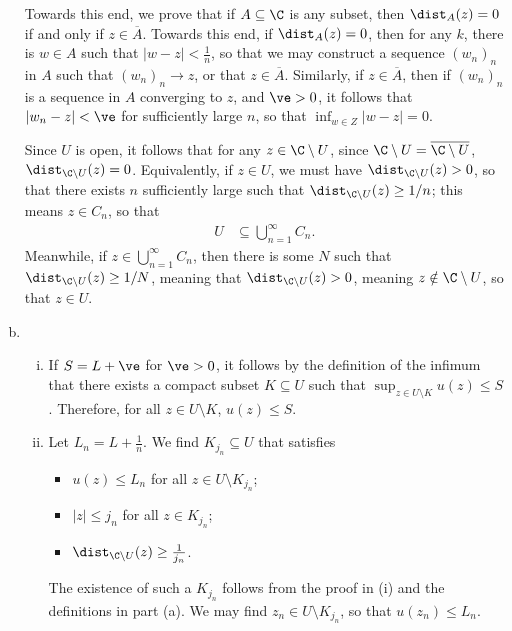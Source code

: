 \documentclass[10pt]{mypackage}
\begin{document}
\begin{solution}
\begin{enumerate}[(a)]
      Towards this end, we prove that if $A\subseteq \C$ is any subset, then $ \dist_{A}(z) = 0 $ if and only if $z\in \overline{A}$. Towards this end, if $\dist_{A}(z) = 0$, then for any $k$, there is $w\in A$ such that $\left\vert w-z \right\vert < \frac{1}{n}$, so that we may construct a sequence $\left( w_n \right)_n$ in $A$ such that $\left( w_n \right)_n\rightarrow z$, or that $z\in \overline{A}$. Similarly, if $z\in \overline{A}$, then if $\left( w_n \right)_n$ is a sequence in $A$ converging to $z$, and $\ve > 0$, it follows that $\left\vert w_n - z \right\vert < \ve$ for sufficiently large $n$, so that $\inf_{w\in Z}\left\vert w-z \right\vert = 0$.\newline

      Since $U$ is open, it follows that for any $z\in \C\setminus U$, since $\C\setminus U = \overline{\C\setminus U}$, $\dist_{\C\setminus U} (z) = 0$. Equivalently, if $z\in U$, we must have $\dist_{\C\setminus U}(z) > 0$, so that there exists $n$ sufficiently large such that $\dist_{\C\setminus U}(z) \geq 1/n$; this means $z\in C_n$, so that
      \begin{align*}
        U &\subseteq \bigcup_{n=1}^{\infty}C_n.
      \end{align*}
      Meanwhile, if $z\in \bigcup_{n=1}^{\infty}C_n$, then there is some $N$ such that $\dist_{\C\setminus U}(z) \geq 1/N$, meaning that $\dist_{\C\setminus U}(z) > 0$, meaning $z\notin \C\setminus U$, so that $z\in U$.
    \item\hfill
      \begin{enumerate}[(i)]
        \item If $S = L + \ve$ for $\ve > 0$, it follows by the definition of the infimum that there exists a compact subset $K\subseteq U$ such that $\sup_{z\in U\setminus K} u(z) \leq S$. Therefore, for all $z\in U\setminus K$, $u(z)\leq S$.
        \item Let $L_n = L + \frac{1}{n}$. We find $K_{j_n}\subseteq U$ that satisfies
          \begin{itemize}
            \item $u(z)\leq L_n$ for all $z\in U\setminus K_{j_n}$;
            \item $\left\vert z \right\vert \leq j_n$ for all $z\in K_{j_n}$;
            \item $\dist_{\C\setminus U}(z) \geq \frac{1}{j_n}$.
          \end{itemize}
          The existence of such a $K_{j_n}$ follows from the proof in (i) and the definitions in part (a). We may find $z_n\in U\setminus K_{j_n}$, so that $u\left(z_n\right)\leq L_n$.\newline


\end{enumerate}
\end{enumerate}
\end{solution}
\end{document}
